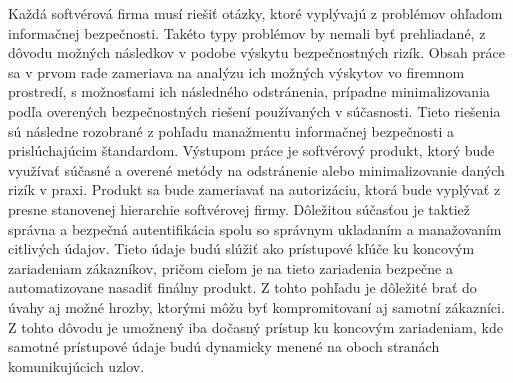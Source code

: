 \newpage
\thispagestyle{plain}

Každá softvérová firma musí riešiť otázky, ktoré vyplývajú z problémov ohľadom informačnej bezpečnosti.
Takéto typy problémov by nemali byť prehliadané, z dôvodu možných následkov v podobe výskytu bezpečnostných rizík.
Obsah práce sa v prvom rade zameriava na analýzu ich možných výskytov vo firemnom prostredí, s možnosťami ich následného
odstránenia, prípadne minimalizovania podľa overených bezpečnostných riešení používaných v súčasnosti.
Tieto riešenia sú následne rozobrané z pohľadu manažmentu informačnej bezpečnosti a prislúchajúcim štandardom.
Výstupom práce je softvérový produkt, ktorý bude využívať súčasné a overené metódy na odstránenie alebo minimalizovanie
daných rizík v praxi.
Produkt sa bude zameriavať na autorizáciu, ktorá bude vyplývať z presne stanovenej hierarchie softvérovej firmy.
Dôležitou súčasťou je taktiež správna a bezpečná autentifikácia spolu so správnym ukladaním a manažovaním citlivých údajov.
Tieto údaje budú slúžiť ako prístupové kľúče ku koncovým zariadeniam zákazníkov, pričom cieľom je na tieto zariadenia
bezpečne a automatizovane nasadiť finálny produkt.
Z tohto pohľadu je dôležité brať do úvahy aj možné hrozby, ktorými môžu byť kompromitovaní aj samotní zákazníci.
Z tohto dôvodu je umožnený iba dočasný prístup ku koncovým zariadeniam, kde samotné prístupové údaje budú dynamicky
menené na oboch stranách komunikujúcich uzlov.
\emptypage

